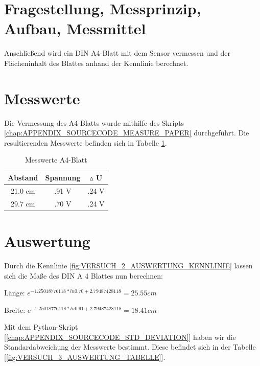 \documentclass[12pt,oneside,a4paper]{report}
\begin{document}
\section{Fragestellung, Messprinzip, Aufbau, Messmittel}
\label{chap:VERSUCH_3_FRAGESTELLUNG}

Anschließend wird ein DIN A4-Blatt mit dem Sensor vermessen und der Flächeninhalt des Blattes anhand der Kennlinie berechnet.

\section{Messwerte}
\label{chap:VERSUCH_3_MESSWERTE}

Die Vermessung des A4-Blatts wurde mithilfe des Skripts \ref{chap:APPENDIX_SOURCECODE_MEASURE_PAPER} durchgeführt. Die resultierenden Messwerte befinden sich in Tabelle \ref{fig:VERSUCH_3_MESSWERTE_TABELLE}.

\begin{table}[H]
	\centering\small
	\begin{tabular}{|c|c|c|}
		\hline
		Abstand & Spannung & $\vartriangle$ U \\
		\hline
		21.0 cm & .91 V & .24 V \\
		\hline
		29.7 cm & .70 V & .24 V \\
		\hline
	\end{tabular}
	\caption{Messwerte A4-Blatt}
	\label{fig:VERSUCH_3_MESSWERTE_TABELLE}
\end{table}

\section{Auswertung}
\label{chap:VERSUCH_3_AUSWERTUNG}

Durch die Kennlinie \ref{fig:VERSUCH_2_AUSWERTUNG_KENNLINIE} lassen sich die Maße des DIN A 4 Blattes nun berechnen:

\begin{description}
	\item Länge: $e^{-1.25018776118 * ln 0.70 + 2.79487428118} = 25.55 cm$
	\item Breite: $e^{-1.25018776118 * ln 0.91 + 2.79487428118} = 18.41 cm$
\end{description}

Mit dem Python-Skript [\ref{chap:APPENDIX_SOURCECODE_STD_DEVIATION}] haben wir die Standardabweichung der Messwerte bestimmt. Diese befindet sich in der Tabelle [\ref{fig:VERSUCH_3_AUSWERTUNG_TABELLE}].
\end{document}
